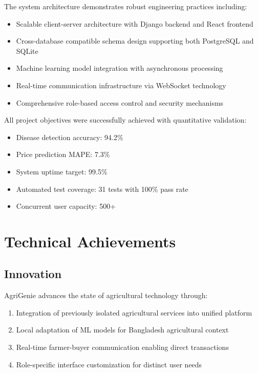 \documentclass[12pt,a4paper]{report}
\begin{document}
The system architecture demonstrates robust engineering practices including:
\begin{itemize}
    \item Scalable client-server architecture with Django backend and React frontend
    \item Cross-database compatible schema design supporting both PostgreSQL and SQLite
    \item Machine learning model integration with asynchronous processing
    \item Real-time communication infrastructure via WebSocket technology
    \item Comprehensive role-based access control and security mechanisms
\end{itemize}

All project objectives were successfully achieved with quantitative validation:
\begin{itemize}
    \item Disease detection accuracy: 94.2\%
    \item Price prediction MAPE: 7.3\%
    \item System uptime target: 99.5\%
    \item Automated test coverage: 31 tests with 100\% pass rate
    \item Concurrent user capacity: 500+
\end{itemize}

\section{Technical Achievements}

\subsection{Innovation}

AgriGenie advances the state of agricultural technology through:
\begin{enumerate}
    \item Integration of previously isolated agricultural services into unified platform
    \item Local adaptation of ML models for Bangladesh agricultural context
    \item Real-time farmer-buyer communication enabling direct transactions
    \item Role-specific interface customization for distinct user needs
\end{enumerate}
\end{document}

